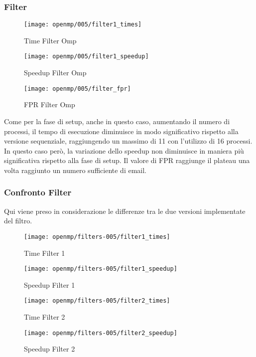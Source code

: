\subsubsection{Filter}\label{subsubsec:fpr-005-filter}
\begin{figure}[H]
    \centering
    \texttt{[image: openmp/005/filter1\_times]}
        \caption{Time Filter Omp}\label{fig:005-filter_time_omp}
    \endminipage\hfill
    \texttt{[image: openmp/005/filter1\_speedup]}
        \caption{Speedup Filter Omp}\label{fig:005-filter_speedup_omp}
    \endminipage\hfill
\end{figure}
\begin{figure}[H]
    \centering
    \texttt{[image: openmp/005/filter\_fpr]}
        \caption{FPR Filter Omp}\label{fig:005-filter_fpr_omp}
    \endminipage\hfill
\end{figure}

Come per la fase di setup, anche in questo caso, aumentando il numero di processi, il tempo di esecuzione diminuisce in
modo significativo rispetto alla versione sequenziale, raggiungendo un massimo di 11 con l'utilizzo di 16 processi.
In questo caso però, la variazione dello speedup non diminuisce in maniera più significativa rispetto alla fase di setup.
Il valore di FPR raggiunge il plateau una volta raggiunto un numero sufficiente di email.

\subsubsection{Confronto Filter}\label{subsubsec:confronto-filter}
Qui viene preso in considerazione le differenze tra le due versioni implementate del filtro.
\begin{figure}[H]
    \centering
    \texttt{[image: openmp/filters-005/filter1\_times]}
        \caption{Time Filter 1}\label{fig:005-filter1_time_omp}
    \endminipage\hfill
    \texttt{[image: openmp/filters-005/filter1\_speedup]}
        \caption{Speedup Filter 1}\label{fig:005-filter1_speedup_omp}
    \endminipage\hfill
\end{figure}
\begin{figure}[H]
    \centering
    \texttt{[image: openmp/filters-005/filter2\_times]}
        \caption{Time Filter 2}\label{fig:005-filter2_time_omp}
    \endminipage\hfill
    \texttt{[image: openmp/filters-005/filter2\_speedup]}
        \caption{Speedup Filter 2}\label{fig:005-filter2_speedup_omp}
    \endminipage\hfill
\end{figure}


